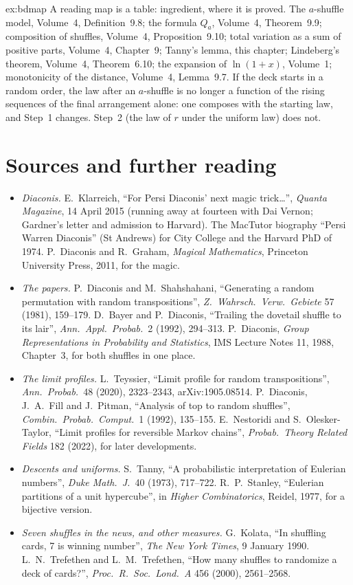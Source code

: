 \begin{solution}{ex:bdmap}
\idea A reading map is a table: ingredient, where it is proved.
\writeup The $a$-shuffle model, Volume~4, Definition~9.8; the formula $Q_a$, Volume~4, Theorem~9.9; composition of shuffles, Volume~4, Proposition~9.10;
total variation as a sum of positive parts, Volume~4, Chapter~9; Tanny's lemma, this chapter; Lindeberg's theorem, Volume~4, Theorem~6.10; the expansion of $\ln(1+x)$, Volume~1;
monotonicity of the distance, Volume~4, Lemma~9.7. If the deck starts in a random order, the law after an $a$-shuffle is no longer a function of the rising sequences of
the final arrangement alone: one composes with the starting law, and Step~1 changes. Step~2 (the law of $r$ under the uniform law) does not.
\end{solution}

\section*{Sources and further reading}

\begin{itemize}
\item \emph{Diaconis.} E.~Klarreich, ``For Persi Diaconis' next magic trick\dots'', \emph{Quanta Magazine}, 14 April 2015 (running away at fourteen with Dai Vernon; Gardner's letter
and admission to Harvard). The MacTutor biography ``Persi Warren Diaconis'' (St Andrews) for City College and the Harvard PhD of 1974. P.~Diaconis and R.~Graham, \emph{Magical
Mathematics}, Princeton University Press, 2011, for the magic.
\item \emph{The papers.} P.~Diaconis and M.~Shahshahani, ``Generating a random permutation with random transpositions'', \emph{Z.\ Wahrsch.\ Verw.\ Gebiete} 57 (1981), 159--179.
D.~Bayer and P.~Diaconis, ``Trailing the dovetail shuffle to its lair'', \emph{Ann.\ Appl.\ Probab.}\ 2 (1992), 294--313. P.~Diaconis, \emph{Group Representations in Probability and
Statistics}, IMS Lecture Notes 11, 1988, Chapter~3, for both shuffles in one place.
\item \emph{The limit profiles.} L.~Teyssier, ``Limit profile for random transpositions'', \emph{Ann.\ Probab.}\ 48 (2020), 2323--2343, arXiv:1905.08514. P.~Diaconis, J.~A.~Fill and J.~Pitman,
``Analysis of top to random shuffles'', \emph{Combin.\ Probab.\ Comput.}\ 1 (1992), 135--155. E.~Nestoridi and S.~Olesker-Taylor, ``Limit profiles for reversible Markov chains'',
\emph{Probab.\ Theory Related Fields} 182 (2022), for later developments.
\item \emph{Descents and uniforms.} S.~Tanny, ``A probabilistic interpretation of Eulerian numbers'', \emph{Duke Math.\ J.}\ 40 (1973), 717--722. R.~P.~Stanley, ``Eulerian partitions of a unit
hypercube'', in \emph{Higher Combinatorics}, Reidel, 1977, for a bijective version.
\item \emph{Seven shuffles in the news, and other measures.} G.~Kolata, ``In shuffling cards, 7 is winning number'', \emph{The New York Times}, 9 January 1990. L.~N.~Trefethen and
L.~M.~Trefethen, ``How many shuffles to randomize a deck of cards?'', \emph{Proc.\ R.\ Soc.\ Lond.\ A} 456 (2000), 2561--2568.
\end{itemize}
